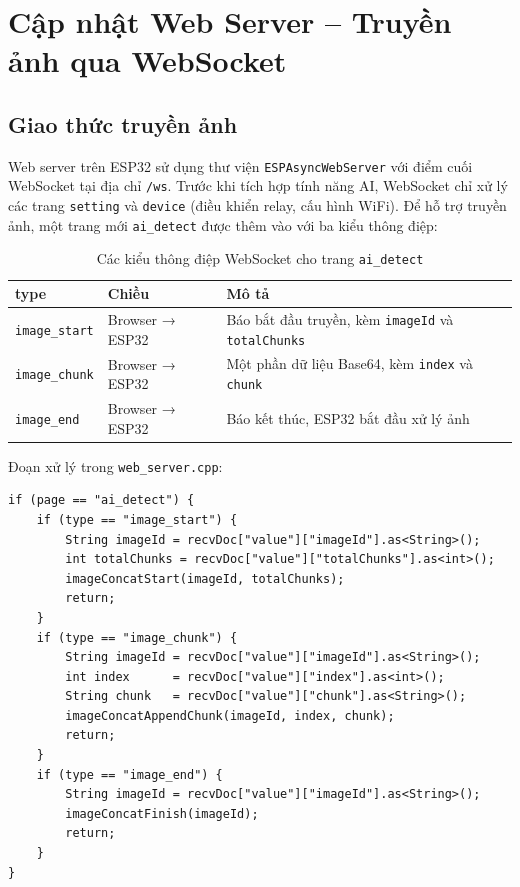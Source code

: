 \documentclass[12pt,a4paper]{article}
\begin{document}
\section{Cập nhật Web Server -- Truyền ảnh qua WebSocket}

\subsection{Giao thức truyền ảnh}

Web server trên ESP32 sử dụng thư viện \texttt{ESPAsyncWebServer} với điểm cuối WebSocket tại địa chỉ \texttt{/ws}. Trước khi tích hợp tính năng AI, WebSocket chỉ xử lý các trang \texttt{setting} và \texttt{device} (điều khiển relay, cấu hình WiFi). Để hỗ trợ truyền ảnh, một trang mới \texttt{ai\_detect} được thêm vào với ba kiểu thông điệp:

\begin{table}[H]
\centering
\caption{Các kiểu thông điệp WebSocket cho trang \texttt{ai\_detect}}
\begin{tabularx}{\linewidth}{@{}l l X@{}}
\toprule
\textbf{type} & \textbf{Chiều} & \textbf{Mô tả} \\
\midrule
\texttt{image\_start} & Browser → ESP32 & Báo bắt đầu truyền, kèm \texttt{imageId} và \texttt{totalChunks} \\
\texttt{image\_chunk} & Browser → ESP32 & Một phần dữ liệu Base64, kèm \texttt{index} và \texttt{chunk} \\
\texttt{image\_end}   & Browser → ESP32 & Báo kết thúc, ESP32 bắt đầu xử lý ảnh \\
\bottomrule
\end{tabularx}
\end{table}

Đoạn xử lý trong \texttt{web\_server.cpp}:

\begin{lstlisting}[caption={Xử lý trang \texttt{ai\_detect} trong \texttt{requestProcessing()}}]
if (page == "ai_detect") {
    if (type == "image_start") {
        String imageId = recvDoc["value"]["imageId"].as<String>();
        int totalChunks = recvDoc["value"]["totalChunks"].as<int>();
        imageConcatStart(imageId, totalChunks);
        return;
    }
    if (type == "image_chunk") {
        String imageId = recvDoc["value"]["imageId"].as<String>();
        int index      = recvDoc["value"]["index"].as<int>();
        String chunk   = recvDoc["value"]["chunk"].as<String>();
        imageConcatAppendChunk(imageId, index, chunk);
        return;
    }
    if (type == "image_end") {
        String imageId = recvDoc["value"]["imageId"].as<String>();
        imageConcatFinish(imageId);
        return;
    }
}
\end{lstlisting}
\end{document}
